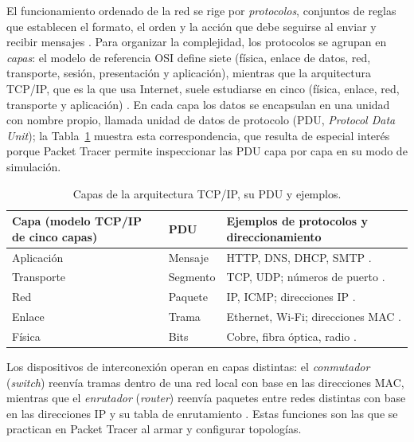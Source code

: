 El funcionamiento ordenado de la red se rige por \emph{protocolos}, conjuntos de reglas que establecen el formato, el orden y la acción que debe seguirse al enviar y recibir mensajes \cite{kurose:computer-networking:2017}. Para organizar la complejidad, los protocolos se agrupan en \emph{capas}: el modelo de referencia OSI define siete (física, enlace de datos, red, transporte, sesión, presentación y aplicación), mientras que la arquitectura TCP/IP, que es la que usa Internet, suele estudiarse en cinco (física, enlace, red, transporte y aplicación) \cite{forouzan:data-comm-networking:2013, kurose:computer-networking:2017}. En cada capa los datos se encapsulan en una unidad con nombre propio, llamada unidad de datos de protocolo (PDU, \emph{Protocol Data Unit}); la Tabla~\ref{tab:prac04:capas} muestra esta correspondencia, que resulta de especial interés porque Packet Tracer permite inspeccionar las PDU capa por capa en su modo de simulación.

\begin{table}[H]
    \centering
    \renewcommand{\arraystretch}{1.3}
    \begin{tabular}{|p{3.2cm}|p{2.6cm}|p{8.8cm}|}
        \hline
        \textbf{Capa (modelo TCP/IP de cinco capas)} & \textbf{PDU} & \textbf{Ejemplos de protocolos y direccionamiento} \\ \hline
        Aplicación & Mensaje & HTTP, DNS, DHCP, SMTP \cite{kurose:computer-networking:2017}. \\ \hline
        Transporte & Segmento & TCP, UDP; números de puerto \cite{kurose:computer-networking:2017}. \\ \hline
        Red & Paquete & IP, ICMP; direcciones IP \cite{kurose:computer-networking:2017}. \\ \hline
        Enlace & Trama & Ethernet, Wi-Fi; direcciones MAC \cite{kurose:computer-networking:2017}. \\ \hline
        Física & Bits & Cobre, fibra óptica, radio \cite{kurose:computer-networking:2017}. \\ \hline
    \end{tabular}
    \caption{Capas de la arquitectura TCP/IP, su PDU y ejemplos.}
    \label{tab:prac04:capas}
\end{table}

Los dispositivos de interconexión operan en capas distintas: el \emph{conmutador} (\emph{switch}) reenvía tramas dentro de una red local con base en las direcciones MAC, mientras que el \emph{enrutador} (\emph{router}) reenvía paquetes entre redes distintas con base en las direcciones IP y su tabla de enrutamiento \cite{forouzan:data-comm-networking:2013}. Estas funciones son las que se practican en Packet Tracer al armar y configurar topologías.

